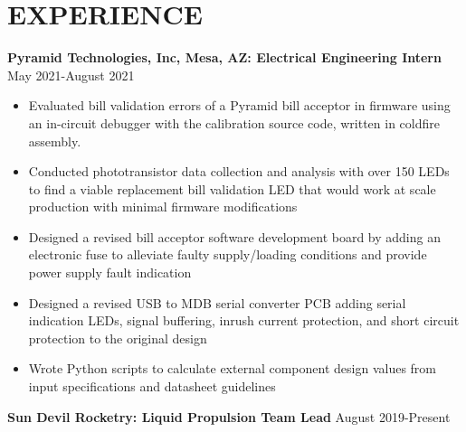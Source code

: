 \documentclass{article}
\begin{document}
\section{EXPERIENCE}
\textbf{Pyramid Technologies, Inc, Mesa, AZ: Electrical Engineering Intern}
\hfill 
\vspace{0.5em}
May 2021-August 2021
\begin{itemize}
\item{Evaluated bill validation errors of a Pyramid bill acceptor in firmware using an in-circuit debugger with the calibration source code, written in coldfire assembly.}
\item{Conducted phototransistor data collection and analysis with over 150 LEDs to find a viable replacement bill validation LED that would work at scale production with minimal firmware modifications}
\item{Designed a revised bill acceptor software development board by adding an electronic fuse to alleviate faulty supply/loading conditions and provide power supply fault indication}
\item{Designed a revised USB to MDB serial converter PCB adding serial indication LEDs, signal buffering, inrush current protection, and short circuit protection to the original design}
\item{Wrote Python scripts to calculate external component design values from input specifications and datasheet guidelines}
\end{itemize}
\vspace{0.5em}
\textbf{Sun Devil Rocketry: Liquid Propulsion Team Lead}
\hfill
\vspace{0.5em}
August 2019-Present
\end{document}
